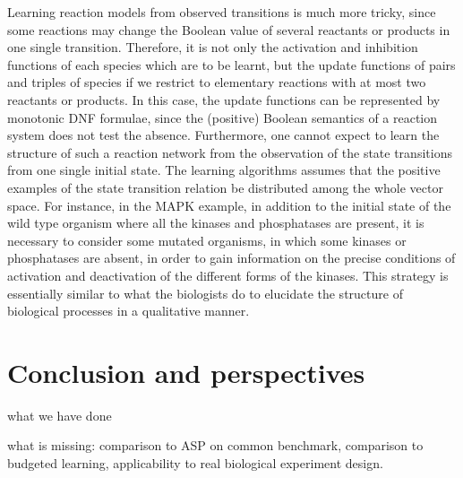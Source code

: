 \documentclass{llncs}
\begin{document}
  Learning reaction models from observed transitions is much more tricky,
  since some reactions may change the Boolean value of several reactants or products in one single transition.
  Therefore, it is not only the activation and inhibition functions of each species which are to be learnt,
  but the update functions of pairs and triples of species if we restrict to elementary reactions with at most two reactants or products.
  In this case, the update functions can be represented by monotonic DNF formulae, since the (positive) Boolean semantics of a reaction system does not test the absence.
Furthermore,   one cannot expect to learn the structure of such a reaction network
from the observation of the state transitions from one single initial state.
The learning algorithms assumes that the positive examples of the state transition relation be distributed
among the whole vector space.
For instance, in the MAPK example, in addition to the initial state of the wild type organism where all the kinases and phosphatases are present,
it is necessary to consider some mutated organisms, in which some kinases or phosphatases are absent,
in order to gain information on the precise conditions of activation and deactivation of the different forms of the kinases.
This strategy is essentially similar to what the biologists do to elucidate the structure of biological processes
in a qualitative manner.


\section{Conclusion and perspectives}

what we have done

what is missing: comparison to ASP on common benchmark, comparison to budgeted learning, applicability to real biological experiment design.



\end{document}
